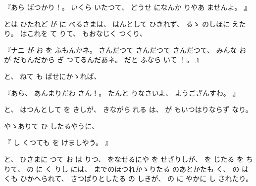 
%
『あら
ばつかり！。
%
いくら
いたつて、
%
どうせ
になんか
りやあ
ませんよ。
』

%
とは
ひたれど
が
に
べるさまは、
%
はんとして
ひきれず、
%
るゝ
のしほに
えたり。
%
はこれを
て
りて、
%
もおなじく
つくり、

%
『ナニ
が
お
を
ふもんかネ。
%
さんだつて
さんだつて
さんだつて、
%
みんな
お
が
だもんだから
ぎ
つてるんだあネ。
%
だと
ふなら
いて
！。
』

%
と、
%
ねて
も
ばせにかゝれば、

%
『あら、
%
あんまりだわ
さん！。
%
たんと
りなさいよ、
%
ようござんすわ。
』

%
と、
%
はつんとして
を
きしが、
%
きながら
れる
は、
%
が
もいつはりならず
なり。%

%
やゝありて
ひ
したるやうに、

%
『
し
くつても
を
けましやう。
』

%
と、
%
ひさまに
つて
お
は
りつ、
%
をなせるにや
を
せざりしが、
%
を
じたる
を
ち
りて、
%
の
に
く
りし
には、
%
までのほつれかゝりたる
のあとかたも
く、
%
の
は
くも
ひかへられて、
%
さつぱりとしたる
の
しきが、
%
の
に
やかに
し
されたり。

